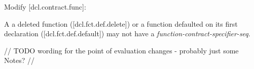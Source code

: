 Modify [dcl.contract.func]:

\begin{adjustwidth}{0.5cm}{0.5cm}
A a deleted function ([dcl.fct.def.delete])\removed{,} or a function defaulted on its first declaration ([dcl.fct.def.default]) may not have a \emph{function-contract-specifier-seq}.
\end{adjustwidth}

// TODO wording for the point of evaluation changes - probably just some Notes? //











